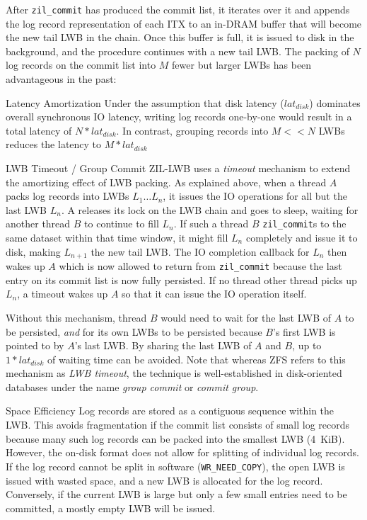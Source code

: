 \documentclass[12pt,a4paper,twoside]{book}
\begin{document}
{After \lstinline{zil_commit} has produced the commit list, it iterates over it and appends the log record representation of each ITX to an in-DRAM buffer that will become the new tail LWB in the chain.
Once this buffer is full, it is issued to disk in the background, and the procedure continues with a new tail LWB.
The packing of $N$ log records on the commit list into $M$ fewer but larger LWBs has been advantageous in the past:
\begin{description}[noitemsep]
    \item[Latency Amortization]
        Under the assumption that disk latency ($lat_{disk}$) dominates overall synchronous IO latency, writing log records one-by-one would result in a total latency of $N * lat_{disk}$.
        In contrast, grouping records into $M << N$ LWBs reduces the latency to $M * lat_{disk}$
    \item[LWB Timeout / Group Commit]
        ZIL-LWB uses a \textit{timeout} mechanism to extend the amortizing effect of LWB packing.
        As explained above, when a thread $A$ packs log records into LWBs $L_1 \dots L_n$, it issues the IO operations for all but the last LWB $L_n$.
        A releases its lock on the LWB chain and goes to sleep, waiting for another thread $B$ to continue to fill $L_n$.
        If such a thread $B$ \lstinline{zil_commit}s to the same dataset within that time window, it might fill $L_n$ completely and issue it to disk, making $L_{n+1}$ the new tail LWB.
        The IO completion callback for $L_n$ then wakes up $A$ which is now allowed to return from \lstinline{zil_commit} because the last entry on its commit list is now fully persisted.
        If no thread other thread picks up $L_n$, a timeout wakes up $A$ so that it can issue the IO operation itself.

        Without this mechanism, thread $B$ would need to wait for the last LWB of $A$ to be persisted, \textit{and} for its own LWBs to be persisted because $B$'s first LWB is pointed to by $A$'s last LWB.
        By sharing the last LWB of $A$ and $B$, up to $1 * lat_{disk}$ of waiting time can be avoided.
        Note that whereas ZFS refers to this mechanism as \textit{LWB timeout}, the technique is well-established in disk-oriented databases under the name \textit{group commit} or \textit{commit group}.

    \item[Space Efficiency]
        Log records are stored as a contiguous sequence within the LWB.
        This avoids fragmentation if the commit list consists of small log records because many such log records can be packed into the smallest LWB (4~KiB).
        However, the on-disk format does not allow for splitting of individual log records.
        If the log record cannot be split in software (\lstinline{WR_NEED_COPY}), the open LWB is issued with wasted space, and a new LWB is allocated for the log record.
        Conversely, if the current LWB is large but only a few small entries need to be committed, a mostly empty LWB will be issued.
\end{description}

}
\end{document}
